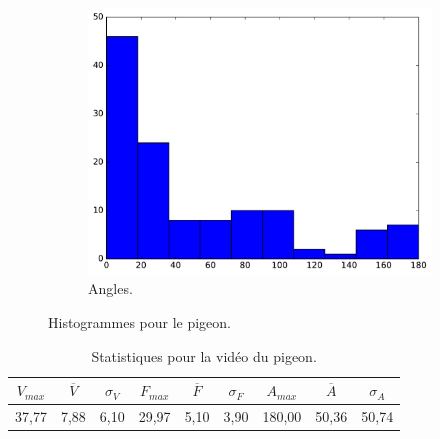 \begin{appendices}
\begin{figure}[htbp]
\begin{subfigure}[t]{\subImgWclicks}
			\centering
			\includegraphics[width=\textwidth]{figures/ch3/oiseau_angle}
			\caption{Angles.}
			\label{fig:oiseau_angle}
		\end{subfigure}
		\caption[Histogrammes pour le pigeon]{Histogrammes pour le pigeon.}
		\label{fig:histOiseau}
	\end{figure}
	
\begin{table}
	\centering
	\begin{tabular}{c c c c c c c c c}
		$V_{max}$	& $\overline{V}$	& $\sigma_{V}$	& $F_{max}$	& $\overline{F}$	& $\sigma_{F}$	& $A_{max}$	& $\overline{A}$	& $\sigma_{A}$	\bigstrut[b] \\ \hline

		37,77		& 7,88				& 6,10			& 29,97		& 5,10				& 3,90			& 180,00	& 50,36				& 50,74			\bigstrut[t] \\
	\end{tabular}
	\caption[Statistiques pour la vidéo du pigeon]{Statistiques pour la vidéo du pigeon.}
	\label{tab:oiseau_stats}
\end{table}





\end{appendices}
